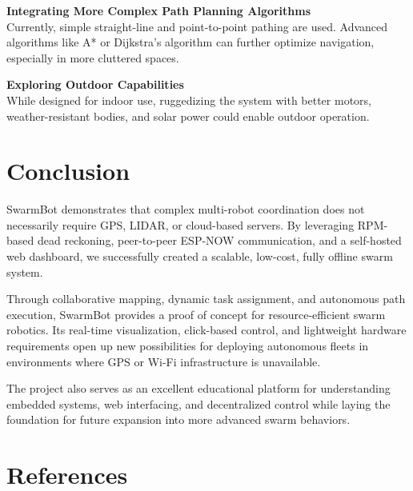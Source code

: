\documentclass[a4paper,12pt]{report}
\begin{document}
\vspace{0.5cm}
\textbf{Integrating More Complex Path Planning Algorithms} \\
Currently, simple straight-line and point-to-point pathing are used. Advanced algorithms like A* or Dijkstra’s algorithm can further optimize navigation, especially in more cluttered spaces.

\vspace{0.5cm}
\textbf{Exploring Outdoor Capabilities} \\
While designed for indoor use, ruggedizing the system with better motors, weather-resistant bodies, and solar power could enable outdoor operation.


\chapter{Conclusion}

SwarmBot demonstrates that complex multi-robot coordination does not necessarily require GPS, LIDAR, or cloud-based servers. By leveraging RPM-based dead reckoning, peer-to-peer ESP-NOW communication, and a self-hosted web dashboard, we successfully created a scalable, low-cost, fully offline swarm system.

Through collaborative mapping, dynamic task assignment, and autonomous path execution, SwarmBot provides a proof of concept for resource-efficient swarm robotics. Its real-time visualization, click-based control, and lightweight hardware requirements open up new possibilities for deploying autonomous fleets in environments where GPS or Wi-Fi infrastructure is unavailable.

The project also serves as an excellent educational platform for understanding embedded systems, web interfacing, and decentralized control while laying the foundation for future expansion into more advanced swarm behaviors.
\chapter{References}
\end{document}
